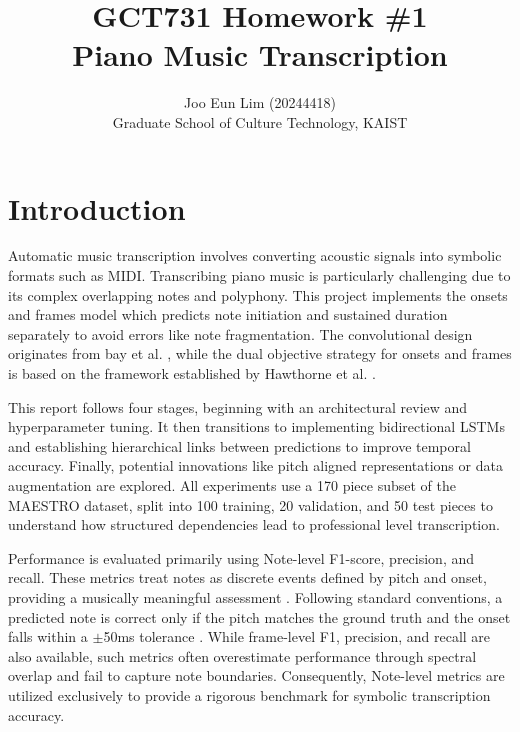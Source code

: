 \documentclass{article}
\title{GCT731 Homework \#1\\Piano Music Transcription}
\author{%
  Joo Eun Lim (20244418) \\
  Graduate School of Culture Technology, KAIST
}
\begin{document}
\maketitle

\section{Introduction}
Automatic music transcription involves converting acoustic signals into symbolic formats such as MIDI. Transcribing piano music is particularly challenging due to its complex overlapping notes and polyphony. This project implements the onsets and frames model which predicts note initiation and sustained duration separately to avoid errors like note fragmentation. The convolutional design originates from bay et al. \cite{bay2009evaluation}, while the dual objective strategy for onsets and frames is based on the framework established by Hawthorne et al. \cite{hawthorne2018onsetsframesdualobjectivepiano}.

This report follows four stages, beginning with an architectural review and hyperparameter tuning. It then transitions to implementing bidirectional LSTMs and establishing hierarchical links between predictions to improve temporal accuracy. Finally, potential innovations like pitch aligned representations or data augmentation are explored. All experiments use a 170 piece subset of the MAESTRO dataset, split into 100 training, 20 validation, and 50 test pieces to understand how structured dependencies lead to professional level transcription.

Performance is evaluated primarily using Note-level F1-score, precision, and recall. These metrics treat notes as discrete events defined by pitch and onset, providing a musically meaningful assessment \cite{bay2009evaluation}. Following standard conventions, a predicted note is correct only if the pitch matches the ground truth and the onset falls within a $\pm$50ms tolerance \cite{hawthorne2018onsetsframesdualobjectivepiano}. While frame-level F1, precision, and recall are also available, such metrics often overestimate performance through spectral overlap and fail to capture note boundaries. Consequently, Note-level metrics are utilized exclusively to provide a rigorous benchmark for symbolic transcription accuracy.
\end{document}
